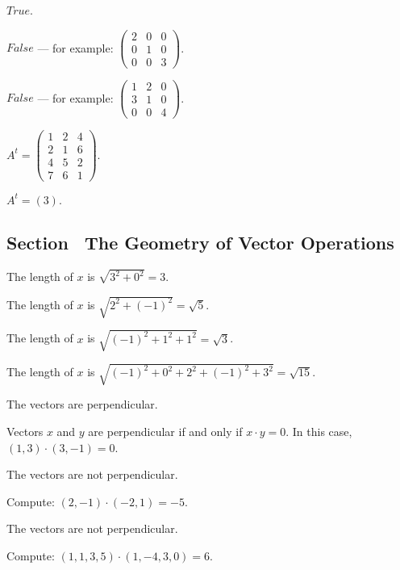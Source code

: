  $True$.

 $False$ --- for example:
$\left(\begin{array}{ccc}
2 & 0 & 0 \\
0 & 1 & 0 \\
0 & 0 & 3 \end{array}\right)$.

 $False$ --- for example:
$\left(\begin{array}{ccc}
1 & 2 & 0 \\
3 & 1 & 0 \\
0 & 0 & 4
\end{array}\right)$.

 \ans $A^t =
\left(\begin{array}{rrr}
1 & 2 & 4 \\
2 & 1 & 6 \\
4 & 5 & 2 \\
7 & 6 & 1
\end{array}\right).$

 \ans $A^t = (3).$



\subsection*{Section~\protect{\ref{S:1.4}} The Geometry of Vector Operations}

 \ans The length of $x$ is $\sqrt{3^2 + 0^2} = 3$.

 \ans The length of $x$ is $\sqrt{2^2 + (-1)^2} = \sqrt{5}$.

 \ans The length of $x$ is $\sqrt{(-1)^2 + 1^2 + 1^2} =
\sqrt{3}$.

 \ans The length of $x$ is $\sqrt{(-1)^2 + 0^2 + 2^2 +
(-1)^2 + 3^2} = \sqrt{15}$.

\newpage
{} \ans The vectors are perpendicular.

\soln Vectors $x$ and $y$ are perpendicular if and only if $x \cdot y = 0$.
In this case, $(1,3) \cdot (3,-1) = 0$.

 \ans The vectors are not perpendicular.

\soln Compute: $(2,-1) \cdot (-2,1) = -5$.

 \ans The vectors are not perpendicular.

\soln Compute: $(1,1,3,5) \cdot (1,-4,3,0) = 6$.

